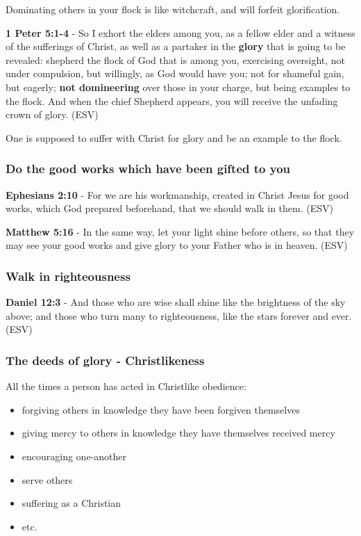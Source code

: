 \documentclass[11pt]{article}
\begin{document}
Dominating others in your flock is like witchcraft, and will forfeit glorification.

\textbf{1 Peter 5:1-4} - So I exhort the elders among you, as a fellow elder and a witness of the sufferings of Christ, as well as a partaker in the \textbf{glory} that is going to be revealed: shepherd the flock of God that is among you, exercising oversight, not under compulsion, but willingly, as God would have you; not for shameful gain, but eagerly; \textbf{not domineering} over those in your charge, but being examples to the flock. And when the chief Shepherd appears, you will receive the unfading crown of glory. (ESV)

One is supposed to suffer with Christ for glory and be an example to the flock.

\subsubsection{Do the good works which have been gifted to you}
\label{sec:orga9fdd3f}
\textbf{Ephesians 2:10} - For we are his workmanship, created in Christ Jesus for good works, which God prepared beforehand, that we should walk in them. (ESV)

\textbf{Matthew 5:16} - In the same way, let your light shine before others, so that they may see your good works and give glory to your Father who is in heaven. (ESV)

\subsubsection{Walk in righteousness}
\label{sec:org915e20e}

\textbf{Daniel 12:3} - And those who are wise shall shine like the brightness of the sky above; and those who turn many to righteousness, like the stars forever and ever. (ESV)

\subsubsection{The deeds of glory - Christlikeness}
\label{sec:org6271883}
All the times a person has acted in Christlike obedience:
\begin{itemize}
\item forgiving others in knowledge they have been forgiven themselves
\item giving mercy to others in knowledge they have themselves received mercy
\item encouraging one-another
\item serve others
\item suffering as a Christian
\item etc.
\end{itemize}
\end{document}
